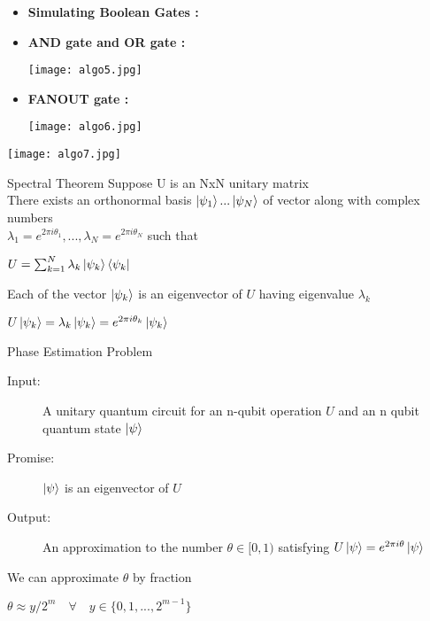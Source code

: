 \documentclass[12pt]{beamer}
\begin{document}
\begin{frame}
\begin{itemize}
 \item\textbf{ Simulating Boolean Gates :}
 \item\textbf{ AND gate and OR gate :}
    \begin{center}
        \texttt{[image: algo5.jpg]}
    \end{center}
 \item\textbf{ FANOUT gate :}
    \begin{center}
        \texttt{[image: algo6.jpg]}
    \end{center}
\end{itemize}
\end{frame}
\begin{frame}
    \begin{center}
        \texttt{[image: algo7.jpg]}
    \end{center}

\end{frame}
\begin{frame}{Spectral Theorem}
Suppose U is an NxN unitary matrix \\ 
There exists an orthonormal basis { $\ket{\psi_1}...\ket{\psi_N}$} of vector along with complex numbers \\
$\lambda_1 = e^{2\pi i\theta_1}, ... ,\lambda_N = e^{2\pi i \theta_N}$ such that \\
\begin{center}
$U = \sum_{k=1}^{N}\lambda_k \ket{\psi_k}\bra{\psi_k}$
\end{center}
Each of the vector $\ket{\psi_k}$ is an eigenvector of $U$ having eigenvalue $\lambda_k$
\begin{center}
$U\ket{\psi_k} = \lambda_k\ket{\psi_k} = e^{2\pi i \theta_k} \ket{\psi_k}$
\end{center}
\end{frame}
\begin{frame}{Phase Estimation Problem}
\begin{description}
\item[Input: ] A unitary quantum circuit for an n-qubit operation $U$ and an n qubit quantum state $\ket{\psi}$ 
\item[Promise: ] $\ket{\psi}$ is an eigenvector of $U$
\item[Output: ] An approximation to the number $\theta \in [0,1)$ satisfying $U\ket{\psi}=e^{2\pi i \theta}\ket{\psi}$
\end{description}
We can approximate $\theta$ by fraction 
\begin{center}
$\theta \approx {y/2^m} \quad \forall \quad y\in  \{0,1,...,2^{m-1}\} $
\end{center}
\end{frame}
\end{document}
